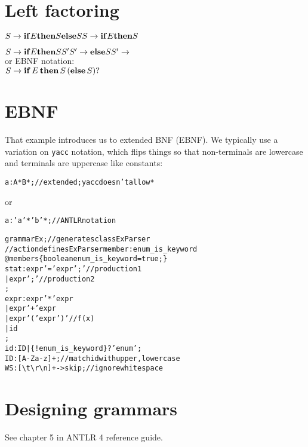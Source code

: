 \documentclass[11pt,twocolumn,nocopyright]{sigplanconf}
\begin{document}
\section{Left factoring}

\noindent $
S \rightarrow {\bf if} E {\bf then} S {\bf else} S\\
S \rightarrow {\bf if} E {\bf then} S\\
$

\noindent $
S \rightarrow {\bf if} E {\bf then} S S'\\
S' \rightarrow {\bf else} S \\
S' \rightarrow
$\\

\noindent or EBNF notation:\\

\noindent $
S \rightarrow {\bf if}\, E\, {\bf then}\, S\, ({\bf else}\, S)?\\
$
\section{EBNF}

That example introduces us to extended BNF (EBNF). We typically use a variation on {\tt yacc} notation, which flips things so that non-terminals are lowercase and terminals are uppercase like constants:

\begin{alltt}
a : A* B* ; // extended; yacc doesn't allow *
\end{alltt}

\noindent or

\begin{alltt}
a : 'a'* 'b'* ; // ANTLR notation
\end{alltt}

\begin{alltt}\small
grammar Ex; // generates class ExParser
// action defines ExParser member: enum_is_keyword
@members \{boolean enum_is_keyword = true;\}
stat: expr '=' expr ';' // production 1
    | expr ';'          // production 2
    ;
expr: expr '*' expr
    | expr '+' expr
    | expr '(' expr ')' // f(x)
    | id
    ;
id  : ID | \{!enum_is_keyword\}? 'enum' ;
ID  : [A-Za-z]+ ; // match id with upper, lowercase
WS  : [ \textbackslash{}t\textbackslash{}r\textbackslash{}n]+ -> skip ; // ignore whitespace
\end{alltt}

\section{Designing grammars}

See chapter 5 in ANTLR 4 reference guide.
\end{document}
